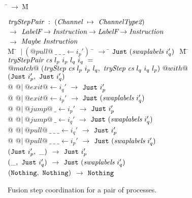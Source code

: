 \begin{figure}
\begin{tabbing}
\=$~\to~$\=M\kill

$\textit{tryStepPair} ~:~ (\textit{Channel} ~\mapsto~ \textit{ChannelType2})$ \\
\> $\to$ \> $\textit{LabelF} \to \textit{Instruction} \to \textit{LabelF} \to \textit{Instruction}$ \\
\> $\to$ \> $\textit{Maybe}~\textit{Instruction}$ \\

M \= $~|~(@pull@~\_~\_~\_ \gets i_p')~$ \= $\to$ \= $\texttt{Just}~ (\textit{swaplabels}~i_q')~$ \= M \=\kill
$\textit{tryStepPair} ~\textit{cs}~l_p~i_p~l_q~i_q~=$ \\
\> $@match@~ (\textit{tryStep}~\textit{cs}~l_p~i_p~l_q,~\textit{tryStep}~\textit{cs}~l_q~i_q~l_p) ~@with@$ \\
\> $(\texttt{Just}~ i_p',~\texttt{Just}~ i_q')$ \\

\> @ @$|~@exit@ \gets i_q'$ \> $\to$ \> $\texttt{Just}~ i_p'$
\>  \\[0.5ex]

\> @ @$|~@exit@ \gets i_p'$ \> $\to$ \> $\texttt{Just}~ (\textit{swaplabels}~i_q')$
\>  \\[0.5ex]

\> @ @$|~@jump@~\_ \gets i_p'$ \> $\to$ \> $\texttt{Just}~ i_p'$
\>  \\[0.5ex]

\> @ @$|~@jump@~\_ \gets i_q'$ \> $\to$ \> $\texttt{Just}~ (\textit{swaplabels}~i_q')$
\>  \\[0.5ex]

\> @ @$|~@pull@~\_~\_~\_ \gets i_q'$ \> $\to$ \> $\texttt{Just}~ i_p'$
\>  \\[0.5ex]

\> @ @$|~@pull@~\_~\_~\_ \gets i_p'$ \> $\to$ \> $\texttt{Just}~ (\textit{swaplabels}~i_q')$
\>  \\[0.5ex]

\> $(\texttt{Just}~ i_p',~\_)$ \> $\to$ \> $\texttt{Just}~ i_p'$
\>  \\[0.5ex]

\> $(\_, ~\texttt{Just}~ i_q')$ \> $\to$ \> $\texttt{Just}~ (\textit{swaplabels}~i_q')$
\>  \\[0.5ex]

\> $(\texttt{Nothing}, ~\texttt{Nothing})$ \> $\to$ \> $\texttt{Nothing}$
\> 
\end{tabbing}
\caption{Fusion step coordination for a pair of processes.}
\label{fig:Finite:tryStepPair}
\end{figure}

